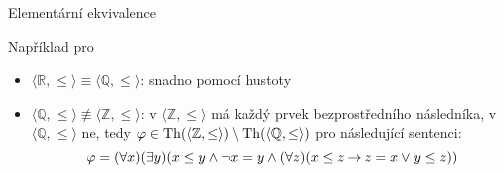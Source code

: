 \documentclass{beamer}
\begin{document}
\begin{frame}{Elementární ekvivalence}
    

    \bigskip

    Například pro 
    \begin{itemize}
        \item  \alert{$\langle\mathbb R,\leq\rangle\equiv\langle\mathbb Q,\leq\rangle$}: snadno pomocí \alert{hustoty}
        \item \alert{$\langle\mathbb Q,\leq\rangle\not\equiv\langle\mathbb Z,\leq\rangle$}: v $\langle\mathbb Z,\leq\rangle$ má každý prvek bezprostředního následníka, v $\langle\mathbb Q,\leq\rangle$ ne, tedy $\varphi\in\operatorname{Th}(\langle\mathbb Z,\leq\rangle)\setminus\operatorname{Th}(\langle\mathbb Q,\leq\rangle)$ pro následující sentenci:
        $$
        \varphi=(\forall x)(\exists y)(x\leq y\land \neg x=y\land(\forall z)(x\leq z\mathbin{\rightarrow} z=x\lor y\leq z))
        $$        
    \end{itemize}

\end{frame}
\end{document}
